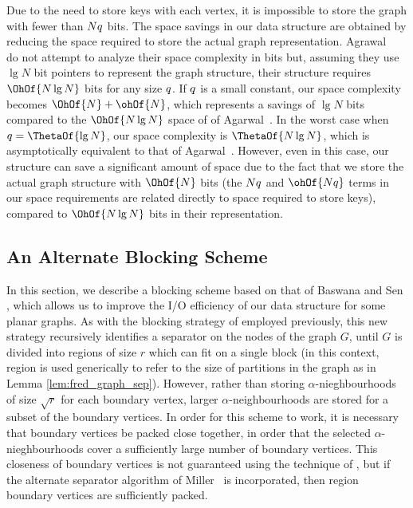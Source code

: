 {Due to the need to store keys with each vertex, it is impossible to
store the graph with fewer than $Nq$ bits.  The space savings in our
data structure are obtained by reducing the space required to store
the actual graph representation.
Agrawal~\etal~\cite{DBLP:conf/soda/AgarwalAMVV98} do not attempt to
analyze their space complexity in bits but, assuming they use
$\lg{N}$ bit pointers to represent the graph structure, their
structure requires $\OhOf{N \lg{N}}$ bits for any size $q$. 
If $q$ is
a small constant, our space complexity becomes $\OhOf{N} +
\ohOf{N}$, which represents a savings of $\lg{N}$ bits compared to
the $\OhOf{N \lg{N}}$ space of of Agarwal~\etal. 
In the worst case
when $\bitsPerKey = \ThetaOf{\lg{N}}$, our space complexity is 
$\ThetaOf{N \lg{N}}$, which is asymptotically equivalent to that of
Agarwal~\etal. 
However, even in this case, our structure can save a
significant amount of space due to the fact that we store the actual
graph structure with $\OhOf{N}$ bits (the $Nq$ and $\ohOf{N\bitsPerKey}$
terms in our space requirements are related directly to space required
to store keys), compared to $\OhOf{N \lg{N}}$ bits in their
representation.

\subsection{An Alternate Blocking Scheme}\label{sec:alt_block_scheme}

In this section, we describe a blocking scheme based on that
of Baswana and Sen \cite{DBLP:journals/algorithmica/BaswanaS02}, which
allows us to improve the I/O efficiency of our data structure for some
planar graphs. 
As with the blocking strategy of
\cite{DBLP:conf/soda/AgarwalAMVV98} employed previously, this new
strategy recursively identifies a separator on the nodes of the graph
$G$, until $G$ is divided into regions of size $r$ which can fit on a
single block (in this context, region is used generically to refer to
the size of partitions in the graph as in Lemma
\ref{lem:fred_graph_sep}). However, rather than storing
$\alpha$-nieghbourhoods of size $\sqrt{r}$ for each boundary vertex,
larger $\alpha$-neighbourhoods are stored for a subset of the boundary
vertices. 
In order for this scheme to work, it is necessary that
boundary vertices be packed close together, in order that the selected
$\alpha$-nieghbourhoods cover a sufficiently large number of boundary
vertices. This closeness of boundary vertices is not guaranteed using
the technique of \cite{DBLP:conf/soda/AgarwalAMVV98}, but if the
alternate separator algorithm of Miller~\cite{miller_1986} is
incorporated, then region boundary vertices are sufficiently packed.

}
